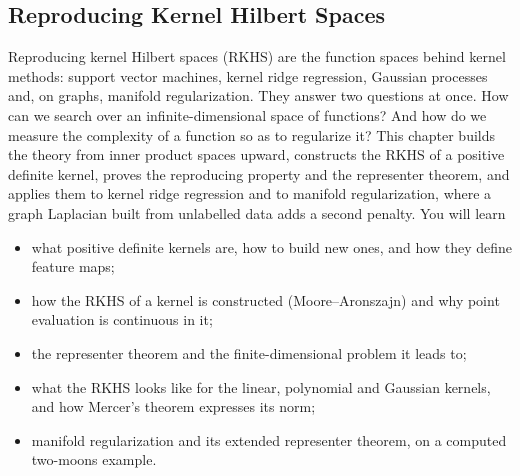 \begin{notechapter}
\forgetcs\hilb{}
\forgetcs\hk{}
\forgetcs\X{}
\forgetcs\mat\newcommand{\mat}[1]{\mathbf{#1}}
\forgetcs\vect\newcommand{\vect}[1]{\boldsymbol{#1}}
\forgetcs\spn\newcommand{\spn}{\operatorname{span}}
\chapter{Reproducing Kernel Hilbert Spaces}\label{ch:rkhs}

\begin{chapterintro}
Reproducing kernel Hilbert spaces (RKHS) are the function spaces behind kernel methods: support vector machines, kernel ridge regression, Gaussian processes and, on graphs, manifold regularization. They answer two questions at once. How can we search over an infinite-dimensional space of functions? And how do we measure the complexity of a function so as to regularize it? This chapter builds the theory from inner product spaces upward, constructs the RKHS of a positive definite kernel, proves the reproducing property and the representer theorem, and applies them to kernel ridge regression and to manifold regularization, where a graph Laplacian built from unlabelled data adds a second penalty. You will learn
\begin{itemize}[nosep]
  \item what positive definite kernels are, how to build new ones, and how they define feature maps;
  \item how the RKHS of a kernel is constructed (Moore--Aronszajn) and why point evaluation is continuous in it;
  \item the representer theorem and the finite-dimensional problem it leads to;
  \item what the RKHS looks like for the linear, polynomial and Gaussian kernels, and how Mercer's theorem expresses its norm;
  \item manifold regularization and its extended representer theorem, on a computed two-moons example.
\end{itemize}
\end{chapterintro}


\end{notechapter}
